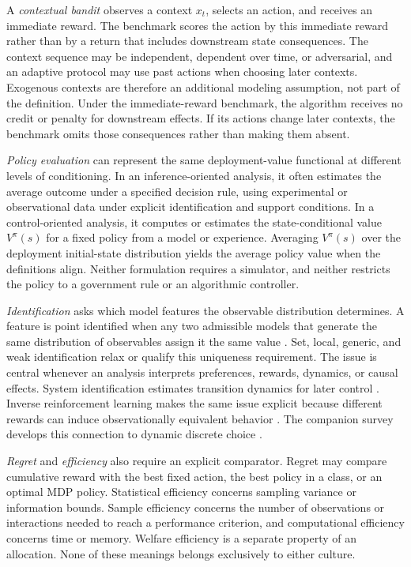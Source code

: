 A \emph{contextual bandit} observes a context $x_t$, selects an action, and receives an immediate reward. The benchmark scores the action by this immediate reward rather than by a return that includes downstream state consequences. The context sequence may be independent, dependent over time, or adversarial, and an adaptive protocol may use past actions when choosing later contexts. Exogenous contexts are therefore an additional modeling assumption, not part of the definition. Under the immediate-reward benchmark, the algorithm receives no credit or penalty for downstream effects. If its actions change later contexts, the benchmark omits those consequences rather than making them absent.

\emph{Policy evaluation} can represent the same deployment-value functional at different levels of conditioning. In an inference-oriented analysis, it often estimates the average outcome under a specified decision rule, using experimental or observational data under explicit identification and support conditions. In a control-oriented analysis, it computes or estimates the state-conditional value $V^\pi(s)$ for a fixed policy from a model or experience. Averaging $V^\pi(s)$ over the deployment initial-state distribution yields the average policy value when the definitions align. Neither formulation requires a simulator, and neither restricts the policy to a government rule or an algorithmic controller.

\emph{Identification} asks which model features the observable distribution determines. A feature is point identified when any two admissible models that generate the same distribution of observables assign it the same value \citep{Lewbel2019}. Set, local, generic, and weak identification relax or qualify this uniqueness requirement. The issue is central whenever an analysis interprets preferences, rewards, dynamics, or causal effects. System identification estimates transition dynamics for later control \citep{RossBagnell2012}. Inverse reinforcement learning makes the same issue explicit because different rewards can induce observationally equivalent behavior \citep{KimGarg2021}. The companion survey develops this connection to dynamic discrete choice \citep{RustRawat2026}.

\emph{Regret} and \emph{efficiency} also require an explicit comparator. Regret may compare cumulative reward with the best fixed action, the best policy in a class, or an optimal MDP policy. Statistical efficiency concerns sampling variance or information bounds. Sample efficiency concerns the number of observations or interactions needed to reach a performance criterion, and computational efficiency concerns time or memory. Welfare efficiency is a separate property of an allocation. None of these meanings belongs exclusively to either culture.

